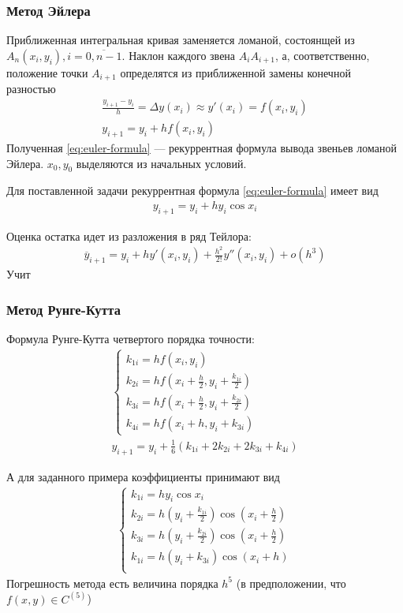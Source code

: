 \subsubsection{Метод Эйлера}
Приближенная интегральная кривая заменяется ломаной, состоянщей из \(A_n(x_i, y_i), i = \overline{0, n-1}\). Наклон каждого звена \(A_iA_{i+1}\), а, соответственно, положение точки \(A_{i+1}\) определятся из приближенной замены конечной разностью
\begin{align}
	\frac{y_{i+1} - y_i}{h} = \Delta y(x_i) \approx y'(x_i) = f(x_i, y_i) \\
	\label{eq:euler-formula}
	y_{i+1} = y_i + h f(x_i, y_i)
\end{align}
Полученная \cref{eq:euler-formula} --- рекуррентная формула вывода звеньев ломаной Эйлера. \(x_0, y_0\) выделяются из начальных условий.

Для поставленной задачи рекуррентная формула \cref{eq:euler-formula} имеет вид
\begin{align}
	y_{i+1} = y_i + h y_i \cos x_i
\end{align}

Оценка остатка идет из разложения в ряд Тейлора:
\begin{align}
	\overline{y}_{i+1} = y_i + h y'(x_i, y_i) + \frac{h^2}{2!} y''(x_i, y_i) + o(h^3)
\end{align}
Учит

\subsubsection{Метод Рунге-Кутта}
Формула Рунге-Кутта четвертого порядка точности:
\begin{align}
	\begin{cases}
		k_{1i} = hf(x_i, y_i)                                             \\
		k_{2i} = hf\left(x_i + \frac{h}{2}, y_i + \frac{k_{1i}}{2}\right) \\
		k_{3i} = hf\left(x_i + \frac{h}{2}, y_i + \frac{k_{2i}}{2}\right) \\
		k_{4i} = hf(x_i + h, y_i + k_{3i})
	\end{cases} \\
	y_{i+1} = y_i + \frac{1}{6}(k_{1i} + 2 k_{2i} + 2 k_{3i} + k_{4i})
\end{align}

А для заданного примера коэффициенты принимают вид
\begin{align}
	\begin{cases}
		k_{1i} = h y_i \cos x_i                                                            \\
		k_{2i} = h \left(y_i + \frac{k_{1i}}{2} \right)\cos\left(x_i + \frac{h}{2} \right) \\
		k_{3i} = h \left(y_i + \frac{k_{2i}}{2} \right)\cos\left(x_i + \frac{h}{2} \right) \\
		k_{1i} = h (y_i + k_{3i}) \cos (x_i + h)                                           \\
	\end{cases}
\end{align}
Погрешность метода есть величина порядка \(h^5\) (в предположении, что \(f(x,y) \in C^{(5)}\))

